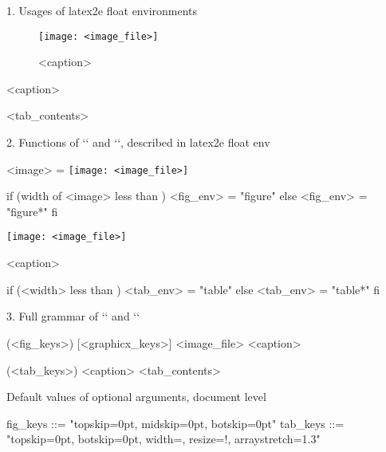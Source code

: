1. Usages of latex2e float environments

\begin{figure}[<position>]
  \centering
  \texttt{[image: <image\_file>]}
  \caption{<caption>}\label{<label>}
\end{figure}

\begin{table}[<position>]
  \centering
  \caption{<caption>}\label{<label>}
  <tab_contents>
\end{table}


2. Functions of `\Figure` and `\Table`, described in latex2e float env

<image> = \texttt{[image: <image\_file>]}

if (width of <image> less than \columnwidth)
  <fig_env> = "figure"
else
  <fig_env> = "figure*"
fi

\begin{<fig_env>}[<position>]
  \centering
  \vspace*{5pt + <topskip>}
  \texttt{[image: <image\_file>]}
  \vspace*{<midskip>}
  \caption{<caption>\label{<label>}}
  \vspace*{<botskip>}
\end{<fig_env>}


if (<width> less than \columnwidth)
  <tab_env> = "table"
else
  <tab_env> = "table*"
fi

\begin{<tab_env>}[<position>]
  \centering
  \renewcommand\arraystretch{<arraystretch>}
  \parbox{<width>}{\caption{<caption>\label{<label>}}
  if (<resize> is "!")
    <tab_contents>
  else
  fi
\end{<tab_env>}


3. Full grammar of `\Figure` and `\Table`

\Figure
  [<position>]                %
  (<fig_keys>)                %
  [<graphicx_keys>]           %
  {<image_file>}              %
  {<caption>\label{<label>}}  %

\Table
  [<position>]                %
  (<tab_keys>)                %
  {<caption>\label{<label>}}  %
  {<tab_contents>}            %


Default values of optional arguments, document level

  fig_keys      ::= "topskip=0pt, midskip=0pt, botskip=0pt"
  tab_keys      ::= "topskip=0pt, botskip=0pt, width=\columnwidth, resize=!, arraystretch=1.3"


